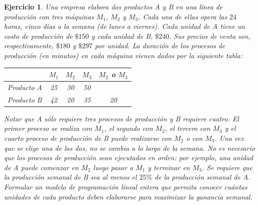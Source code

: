 \documentclass[a4paper,oneside,12pt]{amsart}
\newtheorem{quest}{Ejercicio}
\begin{document}
\begin{quest} 
Una empresa elabora dos productos A y B en una línea de producción con tres máquinas $M_1$, $M_2$ y $M_3$. Cada una de ellas opera las $24$ horas, cinco días a la semana (de lunes a viernes). Cada unidad de A tiene un costo de producción de $\$150$ y cada unidad de B, $\$240$. Sus precios de venta son, respectivamente, $\$180$ y $\$297$ por unidad. La duración de los procesos de producción (en minutos) en cada máquina vienen dados por la siguiente tabla:
    
    \begin{table}[h!]
        \centering
        \begin{tabular}{lcccc}
             & $M_1$ & $M_2$ & $M_3$ & $M_2$ o $M_3$ \\\midrule
            Producto A & 25 & 30 & 50 & \\
            Producto B & 42 & 20 & 35 & 20 \\
        \end{tabular}
    \end{table}
    
    Notar que A sólo requiere tres procesos de producción y B requiere cuatro. El primer proceso se realiza con $M_1$, el segundo con $M_2$, el tercero con $M_3$ y el cuarto proceso de producción de B puede realizarse con $M_2$ o con $M_3$. Una vez que se elige una de las dos, no se cambia a lo largo de la semana. No es necesario que los procesos de producción sean ejecutados en orden: por ejemplo, una unidad de A puede comenzar en $M_2$ luego pasar a $M_1$ y terminar en $M_3$. Se requiere que la producción semanal de B sea al menos el $25\%$ de la producción semanal de A. Formular un modelo de programación lineal entera que permita conocer cuántas unidades de cada producto deben elaborarse para maximizar la ganancia semanal.

\end{quest}


\end{document}
